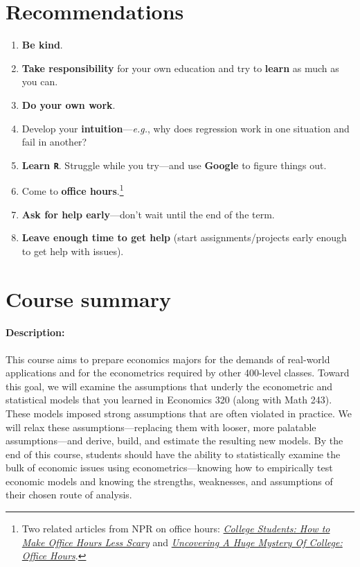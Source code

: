 \documentclass[10pt]{article}
\begin{document}
\section*{Recommendations}

\begin{enumerate}
  \item \textbf{Be kind}.
  \item \textbf{Take responsibility} for your own education and try to \textbf{learn} as much as you can.
  \item \textbf{Do your own work}.
  \item Develop your \textbf{intuition}---\textit{e.g.}, why does regression work in one situation and fail in another?
  \item \textbf{Learn \texttt{R}}. Struggle while you try---and use \textbf{Google} to figure things out.
  \item Come to \textbf{office hours}.\footnote{Two related articles from NPR on office hours: \href{https://www.npr.org/2019/10/05/678815966/college-students-how-to-make-office-hours-less-scary}{\textit{College Students: How to Make Office Hours Less Scary}} and \href{https://www.npr.org/2019/10/02/766568824/uncovering-a-huge-mystery-of-college-office-hours}{\textit{Uncovering A Huge Mystery Of College: Office Hours}}.}
  \item \textbf{Ask for help early}---don't wait until the end of the term.
  \item \textbf{Leave enough time to get help} (start assignments/projects early enough to get help with issues).
\end{enumerate}

\section*{Course summary}

\paragraph{Description:} This course aims to prepare economics majors for the demands of real-world applications and for the econometrics required by other 400-level classes. Toward this goal, we will examine the assumptions that underly the econometric and statistical models that you learned in Economics 320 (along with Math 243). These models imposed strong assumptions that are often violated in practice. We will relax these assumptions---replacing them with looser, more palatable assumptions---and derive, build, and estimate the resulting new models. By the end of this course, students should have the ability to statistically examine the bulk of economic issues using econometrics---knowing how to empirically test economic models and knowing the strengths, weaknesses, and assumptions of their chosen route of analysis.
\end{document}
